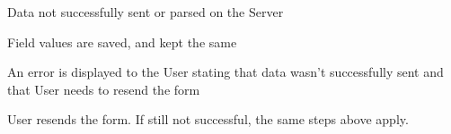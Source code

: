 \begin{packed_item}
\begin{packed_item}
						\item[6.a, 7.a] Data not successfully sent or parsed on the Server
						\item[] \begin{packed_enum}
							\item Field values are saved, and kept the same
							\item An error is displayed to the User stating that data wasn't successfully sent and that User needs to resend the form
							\item User resends the form. If still not successful, the same steps above apply.
						\end{packed_enum}
														
					\end{packed_item}
							
				\end{packed_item}
					
